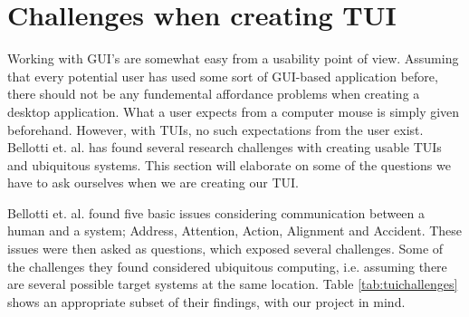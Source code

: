 \section{Challenges when creating TUI}
\label{sec:challenges-with-TUI}

Working with GUI's are somewhat easy from a usability point of view. Assuming that every potential user has used some sort of GUI-based application before, there should not be any fundemental affordance problems when creating a desktop application. What a user expects from a computer mouse is simply given beforehand. However, with TUIs, no such expectations from the user exist. Bellotti et. al. \cite{bellotti2002making} has found several research challenges with creating usable TUIs and ubiquitous systems. This section will elaborate on some of the questions we have to ask ourselves when we are creating our TUI.


Bellotti et. al. found five basic issues considering communication between a human and a system; Address, Attention, Action, Alignment and Accident.  
These issues were then asked as questions, which exposed several challenges. 
Some of the challenges they found considered ubiquitous computing, i.e. assuming there are several possible target systems at the same location. Table \ref{tab:tuichallenges} shows an appropriate subset of their findings, with our project in mind.   

